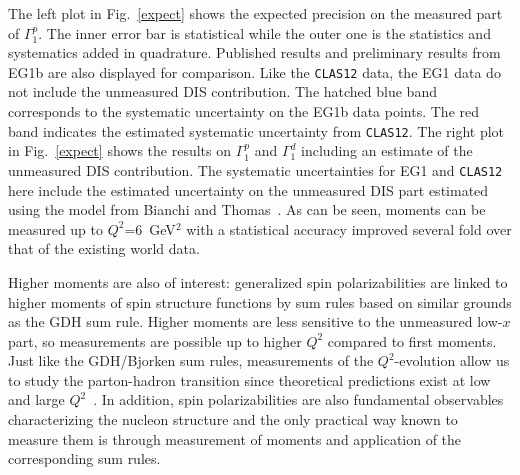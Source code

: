The left plot in Fig.~\ref{expect} shows the expected precision on the 
measured part of $\Gamma_1^p$.  The inner error bar is statistical while the 
outer one is the statistics and systematics added in quadrature.  Published 
results and preliminary results from EG1b are also displayed for comparison. 
Like the {\tt CLAS12} data, the EG1 data do not include the unmeasured DIS 
contribution.  The hatched blue band corresponds to the systematic uncertainty 
on the EG1b data points.  The red band indicates the estimated systematic 
uncertainty from {\tt CLAS12}.  The right plot in Fig.~\ref{expect} shows the 
results on $\Gamma_1^p$ and $\Gamma_1^d$ including an estimate of the 
unmeasured DIS contribution.  The systematic uncertainties for EG1 and 
{\tt CLAS12} here include the estimated uncertainty on the unmeasured DIS part 
estimated using the model from Bianchi and Thomas~\cite{Thomas:2000pf}.  As 
can be seen, moments can be measured up to $Q^2$=6~GeV$^2$ with a statistical 
accuracy improved several fold over that of the existing world data.

Higher moments are also of interest: generalized spin polarizabilities
are linked to higher moments of spin structure functions by sum rules based 
on similar grounds as the GDH sum rule. Higher moments are less sensitive to 
the unmeasured low-$x$ part, so measurements are possible up to higher $Q^2$ 
compared to first moments.  Just like the GDH/Bjorken sum rules, measurements 
of the $Q^2$-evolution allow us to study the parton-hadron transition since 
theoretical predictions exist at low and large $Q^2$~\cite{Chen:2005td}.  In 
addition, spin polarizabilities are also fundamental observables characterizing 
the nucleon structure and the only practical way known to measure them is 
through measurement of moments and application of the corresponding sum rules.

